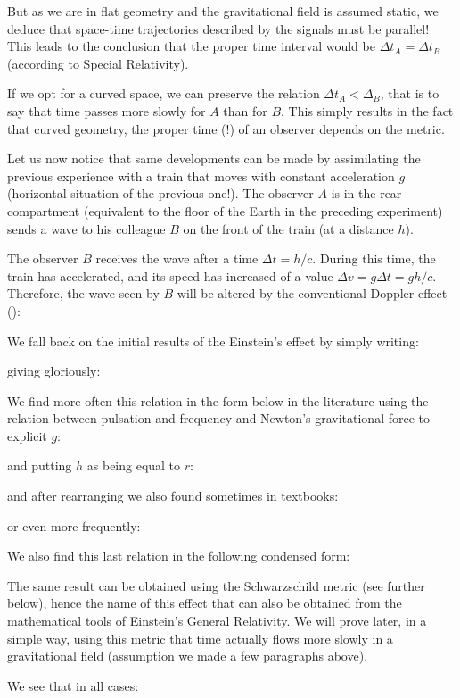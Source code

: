 	But as we are in flat geometry and the gravitational field is assumed static, we deduce that space-time trajectories described by the signals must be parallel! This leads to the conclusion that the proper time interval would be $\Delta t_A=\Delta t_B$ (according to Special Relativity).
	
	If we opt for a curved space, we can preserve the relation $\Delta t_A<\Delta_B$, that is to say that time passes more slowly for $A$ than for $B$. This simply results in the fact that curved geometry, the proper time (!) of an observer depends on the metric.

	Let us now notice that same developments can be made by assimilating the previous experience with a train that moves with constant acceleration $g$ (horizontal situation of the previous one!). The observer $A$ is in the rear compartment (equivalent to the floor of the Earth in the preceding experiment) sends a wave to his colleague $B$ on the front of the train (at a distance $h$).
	
	The observer $B$ receives the wave after a time $\Delta t=h/c$. During this time, the train has accelerated, and its speed has increased of a value $\Delta v=g\Delta t=gh/c$. Therefore, the wave seen by $B$ will be altered by the conventional Doppler effect ():
	
	We fall back on the initial results of the Einstein's effect by simply writing:
	
	giving gloriously:
	
	We find more often this relation in the form below in the literature using the relation between pulsation and frequency and Newton's gravitational force to explicit $g$:
	
	 and putting $h$ as being equal to $r$:
	 
	and after rearranging we also found sometimes in textbooks:
	
	or even more frequently:
	
	We also find this last relation in the following condensed form:
	
	The same result can be obtained using the Schwarzschild metric (see further below), hence the name of this effect that can also be obtained from the mathematical tools of Einstein's General Relativity. We will prove later, in a simple way, using this metric that time actually flows more slowly in a gravitational field (assumption we made a few paragraphs above).
	
	We see that in all cases:
	
